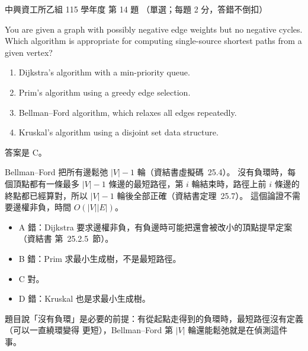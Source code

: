 \begin{pastexam}[label={px:nchu-115-is-14}]{中興資工所乙組 115 學年度 第 14 題}
（單選；每題 2 分，答錯不倒扣）

You are given a graph with possibly negative edge weights but no negative cycles. Which
algorithm is appropriate for computing single-source shortest paths from a given vertex?
\begin{enumerate}[label=\Alph*.,nosep]
\item Dijkstra's algorithm with a min-priority queue.
\item Prim's algorithm using a greedy edge selection.
\item Bellman--Ford algorithm, which relaxes all edges repeatedly.
\item Kruskal's algorithm using a disjoint set data structure.
\end{enumerate}
\end{pastexam}

\begin{pastsoln}
答案是 C。

Bellman--Ford 把所有邊鬆弛 $|V| - 1$ 輪（資結書虛擬碼~25.4）。 沒有負環時，每個頂點都有一條最多
$|V| - 1$ 條邊的最短路徑，第 $i$ 輪結束時，路徑上前 $i$ 條邊的終點都已經算對，所以 $|V| - 1$
輪後全部正確（資結書定理~25.7）。 這個論證不需要邊權非負，時間 $O(|V||E|)$。
\begin{itemize}
\item A 錯：Dijkstra 要求邊權非負，有負邊時可能把還會被改小的頂點提早定案（資結書
第~25.2.5~節）。
\item B 錯：Prim 求最小生成樹，不是最短路徑。
\item C 對。
\item D 錯：Kruskal 也是求最小生成樹。
\end{itemize}
題目說「沒有負環」是必要的前提：有從起點走得到的負環時，最短路徑沒有定義（可以一直繞環變得
更短），Bellman--Ford 第 $|V|$ 輪還能鬆弛就是在偵測這件事。
\end{pastsoln}
